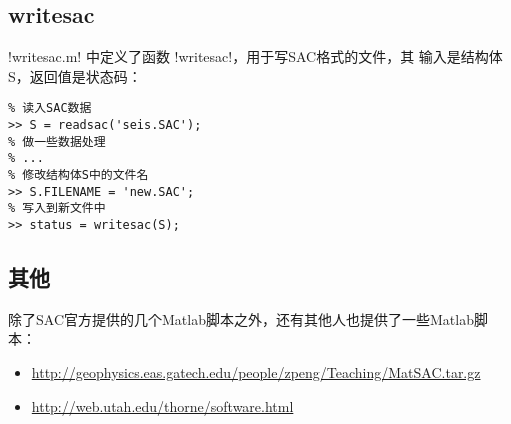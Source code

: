 \subsection{writesac}
!writesac.m! 中定义了函数 !writesac!，用于写SAC格式的文件，其
输入是结构体S，返回值是状态码：
\begin{verbatim}
% 读入SAC数据
>> S = readsac('seis.SAC');
% 做一些数据处理
% ...
% 修改结构体S中的文件名
>> S.FILENAME = 'new.SAC';
% 写入到新文件中
>> status = writesac(S);
\end{verbatim}

\subsection{其他}
除了SAC官方提供的几个Matlab脚本之外，还有其他人也提供了一些Matlab脚本：
\begin{itemize}
\item \url{http://geophysics.eas.gatech.edu/people/zpeng/Teaching/MatSAC.tar.gz}
\item \url{http://web.utah.edu/thorne/software.html}
\end{itemize}
